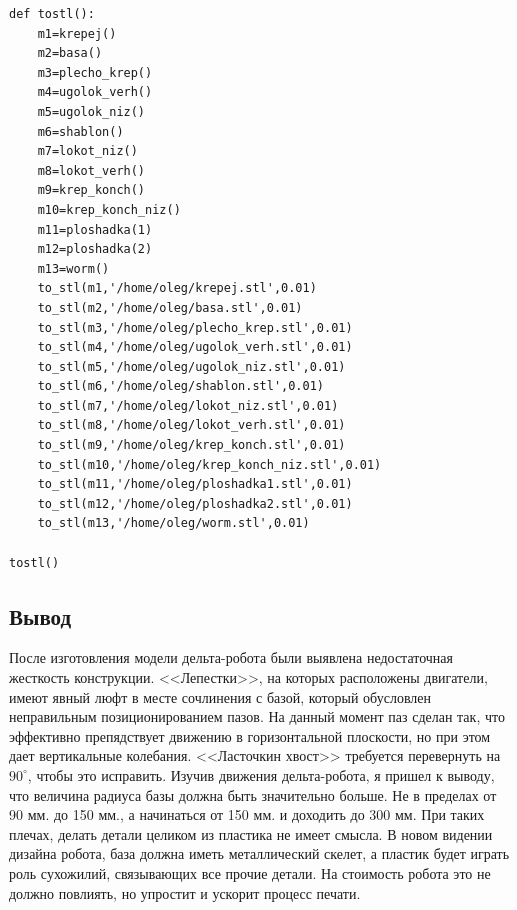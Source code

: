 \begin{lstlisting}[style=python,caption=Создание моделей STL]
def tostl():
    m1=krepej()
    m2=basa()
    m3=plecho_krep()
    m4=ugolok_verh()
    m5=ugolok_niz()
    m6=shablon()
    m7=lokot_niz()
    m8=lokot_verh()
    m9=krep_konch()
    m10=krep_konch_niz()
    m11=ploshadka(1)
    m12=ploshadka(2)
    m13=worm()
    to_stl(m1,'/home/oleg/krepej.stl',0.01)
    to_stl(m2,'/home/oleg/basa.stl',0.01)
    to_stl(m3,'/home/oleg/plecho_krep.stl',0.01)
    to_stl(m4,'/home/oleg/ugolok_verh.stl',0.01)
    to_stl(m5,'/home/oleg/ugolok_niz.stl',0.01)
    to_stl(m6,'/home/oleg/shablon.stl',0.01)
    to_stl(m7,'/home/oleg/lokot_niz.stl',0.01)
    to_stl(m8,'/home/oleg/lokot_verh.stl',0.01)
    to_stl(m9,'/home/oleg/krep_konch.stl',0.01)
    to_stl(m10,'/home/oleg/krep_konch_niz.stl',0.01)
    to_stl(m11,'/home/oleg/ploshadka1.stl',0.01)
    to_stl(m12,'/home/oleg/ploshadka2.stl',0.01)
    to_stl(m13,'/home/oleg/worm.stl',0.01)

tostl()
\end{lstlisting}

\subsection{Вывод}

После изготовления модели дельта-робота были выявлена недостаточная жесткость конструкции. <<Лепестки>>, на которых расположены двигатели, имеют явный люфт в месте сочлинения с базой, который обусловлен неправильным позиционированием пазов. На данный момент паз сделан так, что эффективно препядствует движению в горизонтальной плоскости, но при этом дает вертикальные колебания. <<Ласточкин хвост>> требуется перевернуть на $90^{\circ}$, чтобы это исправить.
Изучив движения дельта-робота, я пришел к выводу, что величина радиуса базы должна быть значительно больше. Не в пределах от 90 мм. до 150 мм., а начинаться от 150 мм. и доходить до 300 мм. При таких плечах, делать детали целиком из пластика не имеет смысла. В новом видении дизайна робота, база должна иметь металлический скелет, а пластик будет играть роль сухожилий, связывающих все прочие детали. На стоимость робота это не должно повлиять, но упростит и ускорит процесс печати.

